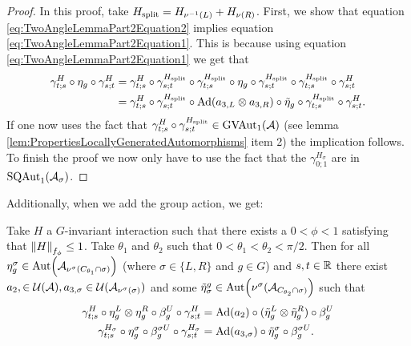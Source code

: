 \documentclass[11pt,a4paper,twoside]{article}
\numberwithin{equation}{section}
\begin{document}
	\begin{proof}
		In this proof, take $\Hsplit=H_{\nu^{-1}(L)}+H_{\nu(R)}$. First, we show that equation \eqref{eq:TwoAngleLemmaPart2Equation2} implies equation \eqref{eq:TwoAngleLemmaPart2Equation1}. This is because using equation \eqref{eq:TwoAngleLemmaPart2Equation1} we get that
		\begin{align}
			\gamma^H_{t;s}\circ\eta_g\circ\gamma^{H}_{s;t}&=\gamma^H_{t;s}\circ\gamma^{\Hsplit}_{s;t}\circ\gamma^{\Hsplit}_{t;s}\circ\eta_g\circ\gamma^{\Hsplit}_{s;t}\circ\gamma^{\Hsplit}_{t;s}\circ\gamma^H_{s;t}\\
			&=\gamma^H_{t;s}\circ\gamma^{\Hsplit}_{s;t}\circ\Ad{a_{3,L}\otimes a_{3,R}}\circ\tilde{\eta}_g\circ\gamma^{\Hsplit}_{t;s}\circ\gamma^H_{s;t}.
		\end{align}
		If one now uses the fact that $\gamma^H_{t;s}\circ\gamma^{\Hsplit}_{s;t}\in\textrm{GVAut}_1(\AA)$ (see lemma \ref{lem:PropertiesLocallyGeneratedAutomorphisms} item 2) the implication follows. To finish the proof we now only have to use the fact that the $\gamma^{H_\sigma}_{0;1}$ are in $\textrm{SQAut}_1(\AA_\sigma)$.
	\end{proof}
	Additionally, when we add the group action, we get:
	\begin{lemma}\label{lem:TwoAngleLemmaPart3}
		Take $H$ a $G$-invariant interaction such that there exists a $0<\phi<1$ satisfying that $\norm{H}_{f_\phi}\leq 1$. Take $\theta_1$ and $\theta_2$ such that $0<\theta_1<\theta_2<\pi/2$. Then for all $\eta_{g}^{\sigma}\in\Aut{\AA_{\nu^{\sigma}(C_{\theta_1}\cap\sigma)}}$ (where $\sigma\in\{L,R\}$ and $g\in G$) and $s,t\in\RR$ there exist $a_{2},\in\UU(\AA),a_{3,\sigma}\in\UU(\AA_{\nu^{\sigma}(\sigma)})$ and some $\tilde{\eta}_{\sigma}^g\in \Aut{\nu^{\sigma}(\AA_{C_{\theta_2}\cap\sigma)}}$ such that
		\begin{align}
			\label{eq:TwoAngleLemmaPart3Equation1}
			\gamma^{H}_{t;s}\circ\eta_{g}^L\otimes\eta_{g}^R\circ\beta_g^U\circ\gamma^{H}_{s;t}&=\Ad{a_2}\circ(\tilde\eta_{g}^L \otimes\tilde\eta_{g}^R)\circ\beta_g^U\\
			\label{eq:TwoAngleLemmaPart3Equation2}
			\gamma^{H_\sigma}_{t;s}\circ\eta_g^\sigma\circ\beta_g^{\sigma U}\circ\gamma^{H_\sigma}_{s;t}&=\Ad{a_{3,\sigma}}\circ \tilde\eta_{g}^\sigma\circ\beta_g^{\sigma U}.
		\end{align}
	\end{lemma}
\end{document}

